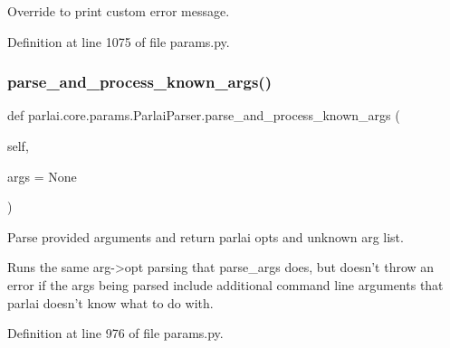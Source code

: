 \begin{DoxyVerb}Override to print custom error message.\end{DoxyVerb}
 

Definition at line 1075 of file params.\+py.

\mbox{\label{classparlai_1_1core_1_1params_1_1ParlaiParser_a0409771a420d08fb51a792a089806c70}} 
\subsubsection{\texorpdfstring{parse\+\_\+and\+\_\+process\+\_\+known\+\_\+args()}{parse\_and\_process\_known\_args()}}
{\footnotesize\ttfamily def parlai.\+core.\+params.\+Parlai\+Parser.\+parse\+\_\+and\+\_\+process\+\_\+known\+\_\+args (\begin{DoxyParamCaption}\item[{}]{self,  }\item[{}]{args = {\ttfamily None} }\end{DoxyParamCaption})}

\begin{DoxyVerb}Parse provided arguments and return parlai opts and unknown arg list.

Runs the same arg->opt parsing that parse_args does, but doesn't
throw an error if the args being parsed include additional command
line arguments that parlai doesn't know what to do with.
\end{DoxyVerb}
 

Definition at line 976 of file params.\+py.



